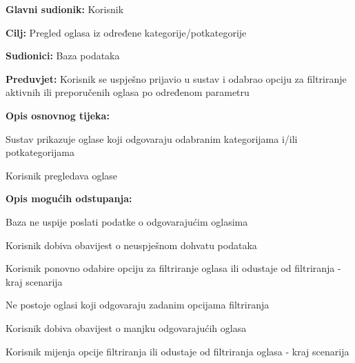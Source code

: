 					\noindent {}
					\begin{packed_item}
	
						\item \textbf{Glavni sudionik: }Korisnik
						\item  \textbf{Cilj:} Pregled oglasa iz određene kategorije/potkategorije
						\item  \textbf{Sudionici:} Baza podataka
						\item  \textbf{Preduvjet:} Korisnik se uspješno prijavio u sustav i odabrao opciju za filtriranje aktivnih ili preporučenih oglasa po određenom parametru
						\item  \textbf{Opis osnovnog tijeka:}
						
						\item[] \begin{packed_enum}
							\item Sustav prikazuje oglase koji odgovaraju odabranim kategorijama i/ili potkategorijama
							\item Korisnik pregledava oglase
						\end{packed_enum}
						\eject
						\item  \textbf{Opis mogućih odstupanja:}

						\item[] \begin{packed_item}
							\item[1.a] Baza ne uspije poslati podatke o odgovarajućim oglasima
							\item[] \begin{packed_enum}
								
								\item Korisnik dobiva obavijest o neuspješnom dohvatu podataka
								\item Korisnik ponovno odabire opciju za filtriranje oglasa ili odustaje od filtriranja - kraj scenarija
							
							\end{packed_enum}	

							\item[1.b] Ne postoje oglasi koji odgovaraju zadanim opcijama filtriranja
							\item[] \begin{packed_enum}
								
								\item Korisnik dobiva obavijest o manjku odgovarajućih oglasa
								\item Korisnik mijenja opcije filtriranja ili odustaje od filtriranja oglasa - kraj scenarija
							
							\end{packed_enum}	
						\end{packed_item}
					\end{packed_item}

